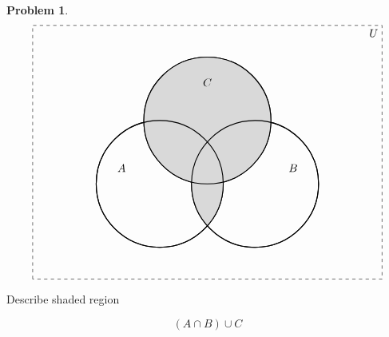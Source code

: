\documentclass{article}
\theoremstyle{definition}
\newtheorem{problem}{Problem}[section]
\begin{document}
\begin{problem}
\[

\begin{tikzpicture}[scale=1.0]

  \draw[dashed] (-4,-3) rectangle (7,5);
  \node[anchor=north east] at (7,5) {$U$};

  \def\r{2}

  \draw[thick] (0,0) circle (\r);
  \draw[thick] (3,0) circle (\r);
  \draw[thick] (1.5,2) circle (\r);


  \begin{scope}
    \clip (1.5,2) circle (\r);
    \fill[gray!30] (-4,-3) rectangle (7,5);
  \end{scope}

  \begin{scope}
    \clip (0,0) circle (\r);
    \clip (3,0) circle (\r);
    \fill[gray!30] (-4,-3) rectangle (7,5);
  \end{scope}

  \draw[thick] (0,0) circle (\r);
  \draw[thick] (3,0) circle (\r);
  \draw[thick] (1.5,2) circle (\r);

  \node at (-1.2,0.5) {$A$};
  \node at (4.2,0.5) {$B$};
  \node at (1.5,3.2) {$C$};

\end{tikzpicture}
\]
    \begin{enumerate}[label=(\alph*)]
        Describe shaded region

        $$ (A \cap B) \cup C $$

    \end{enumerate}
\end{problem}
\end{document}
